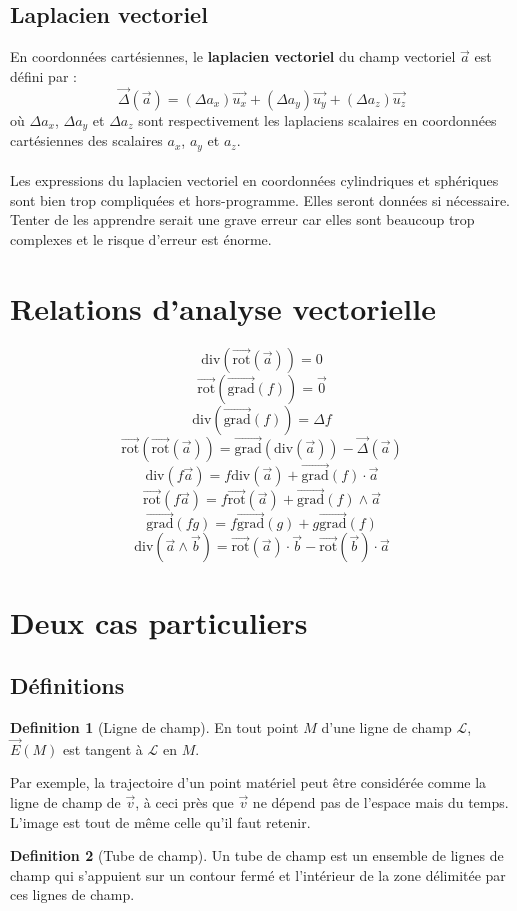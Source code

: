 \documentclass[french]{book}
\theoremstyle{plain}
\theoremstyle{definition}
\newtheorem{dfn}{Definition}
\theoremstyle{remark}
\newcommand{\grad}{\overrightarrow{\text{grad}}}
\newcommand{\rot}{\overrightarrow{\text{rot}}}
\renewcommand{\div}{\text{div}}
\begin{document}
\subsection{Laplacien vectoriel}
En coordonnées cartésiennes, le \textbf{laplacien vectoriel} du champ vectoriel $\overrightarrow{a}$ est défini par : $$\overrightarrow{\Delta}(\overrightarrow{a})=(\Delta a_x)\overrightarrow{u_x}+(\Delta a_y)\overrightarrow{u_y}+(\Delta a_z)\overrightarrow{u_z}$$ où $\Delta a_x$, $\Delta a_y$ et $\Delta a_z$ sont respectivement les laplaciens scalaires en coordonnées cartésiennes des scalaires $a_x$, $a_y$ et $a_z$. \\ \\
Les expressions du laplacien vectoriel en coordonnées cylindriques et sphériques sont bien trop compliquées et hors-programme. Elles seront données si nécessaire. Tenter de les apprendre serait une grave erreur car elles sont beaucoup trop complexes et le risque d'erreur est énorme.
\section{Relations d'analyse vectorielle}
$$\div\left(\rot(\overrightarrow{a})\right)=0$$
$$\rot\left(\grad (f)\right)=\overrightarrow{0}$$
$$\div\left(\grad(f)\right)=\Delta f$$
$$\rot\left(\rot(\overrightarrow{a})\right)=\grad\left(\div(\overrightarrow{a})\right)-\overrightarrow{\Delta}(\overrightarrow{a})$$
$$\div\left(f\overrightarrow{a}\right)=f\div(\overrightarrow{a})+\grad(f)\cdot\overrightarrow{a}$$
$$\rot\left(f\overrightarrow{a}\right)=f\rot(\overrightarrow{a})+\grad(f)\wedge\overrightarrow{a}$$
$$\grad(fg)=f\grad(g)+g\grad(f)$$
$$\div\left(\overrightarrow{a}\wedge\overrightarrow{b}\right)=\rot(\overrightarrow{a})\cdot\overrightarrow{b}-\rot(\overrightarrow{b})\cdot\overrightarrow{a}$$
\section{Deux cas particuliers}
\subsection{Définitions}
\begin{dfn}[Ligne de champ]
	En tout point $M$ d'une ligne de champ $\mathcal{L}$, $\overrightarrow{E}(M)$ est tangent à $\mathcal{L}$ en $M$.
\end{dfn}
Par exemple, la trajectoire d'un point matériel peut être considérée comme la ligne de champ de $\overrightarrow{v}$, à ceci près que $\overrightarrow{v}$ ne dépend pas de l'espace mais du temps. L'image est tout de même celle qu'il faut retenir.
\begin{dfn}[Tube de champ]
	Un tube de champ est un ensemble de lignes de champ qui s'appuient sur un contour fermé et l'intérieur de la zone délimitée par ces lignes de champ.
\end{dfn}
\end{document}
